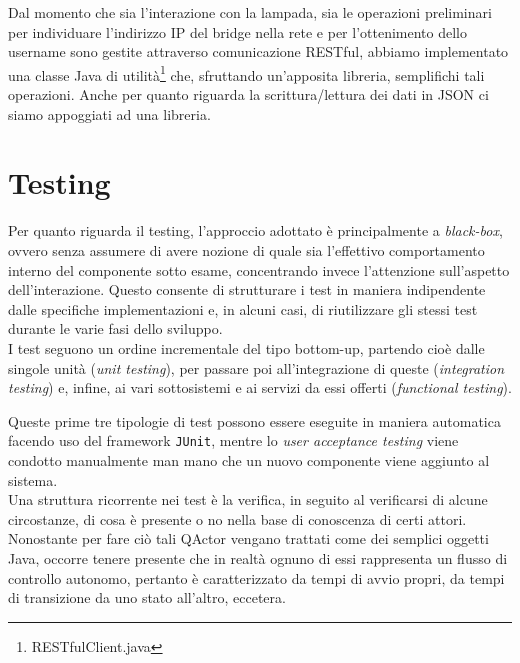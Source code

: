 \documentclass{../llncs}
\newcommand{\labelsec}[1]{\label{sec:#1}}
\newcommand{\labelssec}[1]{\label{ssec:#1}}
\begin{document}
Dal momento che sia l'interazione con la lampada, sia le operazioni preliminari per individuare l'indirizzo IP del bridge nella rete e per l'ottenimento dello username sono gestite attraverso comunicazione RESTful, abbiamo implementato una classe Java di utilità\footnote{RESTfulClient.java} che, sfruttando un'apposita libreria, semplifichi tali operazioni.
Anche per quanto riguarda la scrittura/lettura dei dati in JSON ci siamo appoggiati ad una libreria.

\labelssec{robotImpl}

\section{Testing}
\labelsec{Testing}

Per quanto riguarda il testing, l'approccio adottato è principalmente a \emph{black-box}, ovvero senza assumere di avere nozione di quale sia l'effettivo comportamento interno del componente sotto esame, concentrando invece l'attenzione sull'aspetto dell'interazione. Questo consente di strutturare i test in maniera indipendente dalle specifiche implementazioni e, in alcuni casi, di riutilizzare gli stessi test durante le varie fasi dello sviluppo.\\

I test seguono un ordine incrementale del tipo bottom-up, partendo cioè dalle singole unità (\emph{unit testing}), per passare poi all'integrazione di queste (\emph{integration testing}) e, infine, ai vari sottosistemi e ai servizi da essi offerti (\emph{functional testing}).

Queste prime tre tipologie di test possono essere eseguite in maniera automatica facendo uso del framework \texttt{JUnit}, mentre lo \emph{user acceptance testing} viene condotto manualmente man mano che un nuovo componente viene aggiunto al sistema.\\

Una struttura ricorrente nei test è la verifica, in seguito al verificarsi di alcune circostanze, di cosa è presente o no nella base di conoscenza di certi attori. Nonostante per fare ciò tali QActor vengano trattati come dei semplici oggetti Java, occorre tenere presente che in realtà ognuno di essi rappresenta un flusso di controllo autonomo, pertanto è caratterizzato da tempi di avvio propri, da tempi di transizione da uno stato all'altro, eccetera.
\end{document}
